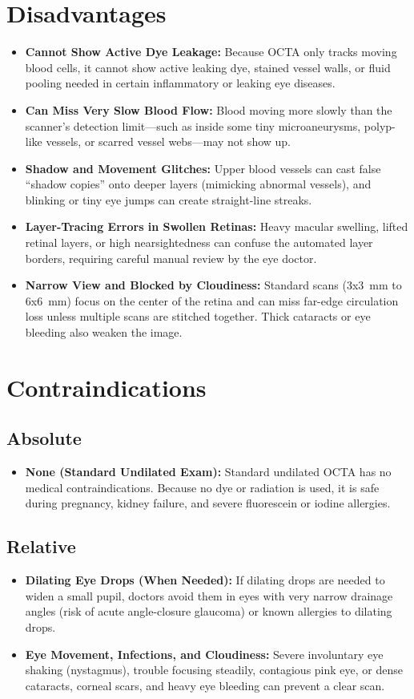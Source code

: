 \section{Disadvantages}
\begin{itemize}
\item \textbf{Cannot Show Active Dye Leakage:} Because OCTA only tracks moving blood cells, it cannot show active leaking dye, stained vessel walls, or fluid pooling needed in certain inflammatory or leaking eye diseases.
\item \textbf{Can Miss Very Slow Blood Flow:} Blood moving more slowly than the scanner's detection limit---such as inside some tiny microaneurysms, polyp-like vessels, or scarred vessel webs---may not show up.
\item \textbf{Shadow and Movement Glitches:} Upper blood vessels can cast false ``shadow copies'' onto deeper layers (mimicking abnormal vessels), and blinking or tiny eye jumps can create straight-line streaks.
\item \textbf{Layer-Tracing Errors in Swollen Retinas:} Heavy macular swelling, lifted retinal layers, or high nearsightedness can confuse the automated layer borders, requiring careful manual review by the eye doctor.
\item \textbf{Narrow View and Blocked by Cloudiness:} Standard scans (3x3~mm to 6x6~mm) focus on the center of the retina and can miss far-edge circulation loss unless multiple scans are stitched together. Thick cataracts or eye bleeding also weaken the image.
\end{itemize}

\section{Contraindications}

\subsection{Absolute}
\begin{itemize}
\item \textbf{None (Standard Undilated Exam):} Standard undilated OCTA has no medical contraindications. Because no dye or radiation is used, it is safe during pregnancy, kidney failure, and severe fluorescein or iodine allergies.
\end{itemize}

\subsection{Relative}
\begin{itemize}
\item \textbf{Dilating Eye Drops (When Needed):} If dilating drops are needed to widen a small pupil, doctors avoid them in eyes with very narrow drainage angles (risk of acute angle-closure glaucoma) or known allergies to dilating drops.
\item \textbf{Eye Movement, Infections, and Cloudiness:} Severe involuntary eye shaking (nystagmus), trouble focusing steadily, contagious pink eye, or dense cataracts, corneal scars, and heavy eye bleeding can prevent a clear scan.
\end{itemize}

